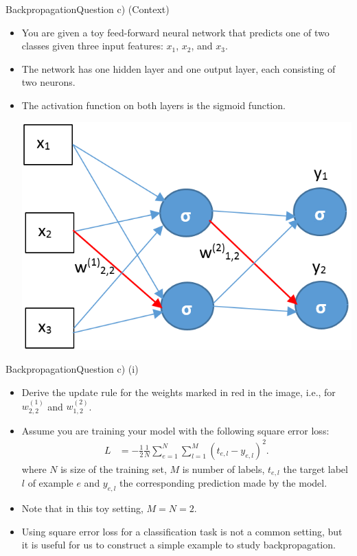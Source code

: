 \documentclass[t]{beamer}
\begin{document}
\begin{frame}{Backpropagation}{Question c) (Context)}
    \begin{itemize}
        \item You are given a toy feed-forward neural network that predicts one
              of two classes given three input features: $x_1$, $x_2$,
              and $x_3$.
        \item The network has one hidden layer and one output layer, each
              consisting of two neurons.
        \item The activation function on both layers is
              the sigmoid function.
              \begin{center}
                  \includegraphics[scale=0.4]{img/backprop_2.png}
              \end{center}
    \end{itemize}
\end{frame}

\begin{frame}{Backpropagation}{Question c) (i)}
    \begin{itemize}
        \item Derive the update rule for the weights marked in red in the
              image, i.e., for $w^{(1)}_{2,2}$ and $w^{(2)}_{1,2}$.
        \item Assume you are training your model with the following square
              error loss:
              \begin{align*}
                  L & = -\frac{1}{2}\frac{1}{N}\sum_{e=1}^{N} \sum_{l=1}^{M} (t_{e,l}-y_{e,l})^2.
              \end{align*}
              where $N$ is size of the training set, $M$ is number of
              labels, $t_{e,l}$ the target label $l$ of example $e$ and
              $y_{e,l}$ the corresponding prediction made by the model.
        \item Note that in this toy setting, $M = N = 2$.
        \item Using square error loss for a classification task is not a
              common setting, but it is useful for us to construct a
              simple example to study backpropagation.
    \end{itemize}
\end{frame}
\end{document}

